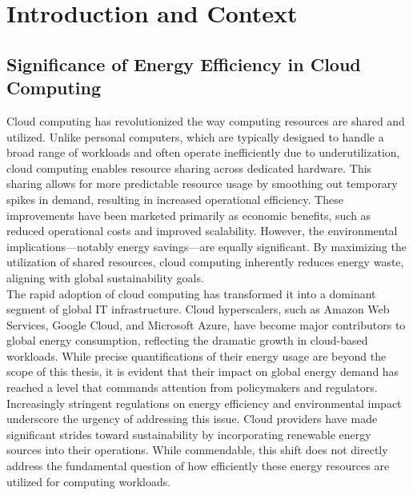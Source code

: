 
\chapter{Introduction and Context} %
\label{Chapter1}

\section{Significance of Energy Efficiency in Cloud Computing}

Cloud computing has revolutionized the way computing resources are shared and utilized. Unlike personal computers, which are typically designed to handle a broad range of workloads and often operate inefficiently due to underutilization, cloud computing enables resource sharing across dedicated hardware. This sharing allows for more predictable resource usage by smoothing out temporary spikes in demand, resulting in increased operational efficiency. These improvements have been marketed primarily as economic benefits, such as reduced operational costs and improved scalability. However, the environmental implications—notably energy savings—are equally significant. By maximizing the utilization of shared resources, cloud computing inherently reduces energy waste, aligning with global sustainability goals.\\
The rapid adoption of cloud computing has transformed it into a dominant segment of global IT infrastructure. Cloud hyperscalers, such as Amazon Web Services, Google Cloud, and Microsoft Azure, have become major contributors to global energy consumption, reflecting the dramatic growth in cloud-based workloads. While precise quantifications of their energy usage are beyond the scope of this thesis, it is evident that their impact on global energy demand has reached a level that commands attention from policymakers and regulators. Increasingly stringent regulations on energy efficiency and environmental impact underscore the urgency of addressing this issue. Cloud providers have made significant strides toward sustainability by incorporating renewable energy sources into their operations. While commendable, this shift does not directly address the fundamental question of how efficiently these energy resources are utilized for computing workloads.\\
